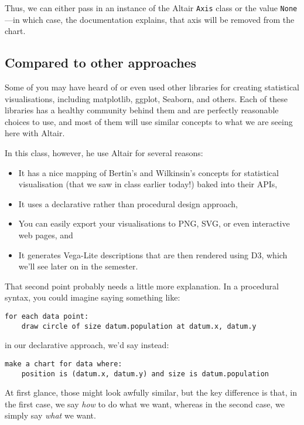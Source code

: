 \documentclass[11pt]{article}
\providecommand{\tightlist}{%
      \setlength{\itemsep}{0pt}\setlength{\parskip}{0pt}}
\begin{document}
Thus, we can either pass in an instance of the Altair \texttt{Axis}
class or the value \texttt{None}---in which case, the documentation
explains, that axis will be removed from the chart.

\subsection{Compared to other
approaches}\label{compared-to-other-approaches}

Some of you may have heard of or even used other libraries for creating
statistical visualisations, including matplotlib, ggplot, Seaborn, and
others. Each of these libraries has a healthy community behind them and
are perfectly reasonable choices to use, and most of them will use
similar concepts to what we are seeing here with Altair.

In this class, however, he use Altair for several reasons:

\begin{itemize}
\tightlist
\item
  It has a nice mapping of Bertin's and Wilkinsin's concepts for
  statistical visualisation (that we saw in class earlier today!) baked
  into their APIs,
\item
  It uses a declarative rather than procedural design approach,
\item
  You can easily export your visualisations to PNG, SVG, or even
  interactive web pages, and
\item
  It generates Vega-Lite descriptions that are then rendered using D3,
  which we'll see later on in the semester.
\end{itemize}

That second point probably needs a little more explanation. In a
procedural syntax, you could imagine saying something like:

\begin{verbatim}
for each data point:
    draw circle of size datum.population at datum.x, datum.y
\end{verbatim}

in our declarative approach, we'd say instead:

\begin{verbatim}
make a chart for data where:
    position is (datum.x, datum.y) and size is datum.population
\end{verbatim}

At first glance, those might look awfully similar, but the key
difference is that, in the first case, we say \emph{how} to do what we
want, whereas in the second case, we simply say \emph{what} we want.
\end{document}
